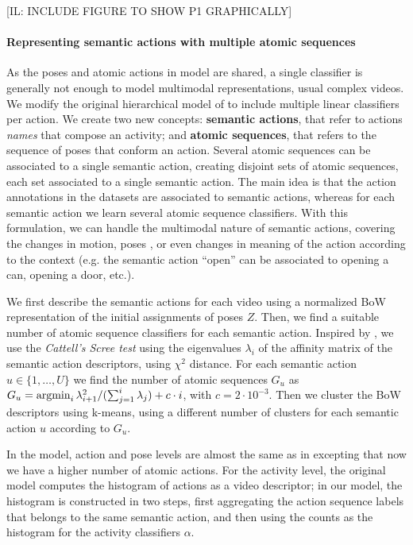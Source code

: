 [IL: INCLUDE  FIGURE TO SHOW P1 GRAPHICALLY]

\paragraph{Representing semantic actions with multiple atomic sequences}

As the poses and atomic actions in \cite{Lillo2014} model are shared, a single classifier is generally not enough to model multimodal representations, usual complex videos. We modify the original hierarchical model of \cite{Lillo2014} to include multiple linear classifiers per action. We create two new concepts: \textbf{semantic actions}, that refer to actions \emph{names} that compose an activity; and \textbf{atomic sequences}, that refers to the sequence of poses that conform an action. Several atomic sequences can be associated to a single semantic action, creating disjoint sets of atomic sequences, each set associated to a single semantic action.  The main idea is that the action annotations in the datasets are associated to semantic actions, whereas for each semantic action we learn several atomic sequence classifiers. With this formulation, we can handle the multimodal nature of semantic actions, covering the changes in motion, poses , or even changes in meaning of the action according to the context (e.g. the semantic action ``open'' can be associated to opening a can, opening a door, etc.). 

We first describe the semantic actions for each video using a normalized BoW representation of the initial assignments of poses $Z$. Then, we find a suitable number of atomic sequence classifiers for each semantic action. Inspired by \cite{Raptis2012}, we use the \emph{Cattell's Scree test} using the eigenvalues $\lambda_i$ of the affinity matrix of the semantic action descriptors, using $\chi^2$ distance. For each semantic action $u \in \{1,\dots,U\}$ we find the number of atomic sequences $G_u$ as $G_u = \operatorname*{argmin}_i \lambda_{i+1}^2 / (\sum_{j=1}^i \lambda_j) + c\cdot i$, with $c=2\cdot 10^{-3}$. Then we cluster the BoW descriptors using k-means, using a different number of clusters for each semantic action $u$ according to $G_u$.

In the model, action and pose levels are almost the same as in \cite{Lillo2014} excepting that now we have a higher number of atomic actions. For the  activity level, the original model computes the histogram of actions as a video descriptor; in our model, the histogram is constructed in two steps, first aggregating the action sequence labels that belongs to the same semantic action, and then using the counts as the histogram for the activity classifiers $\alpha$. 

